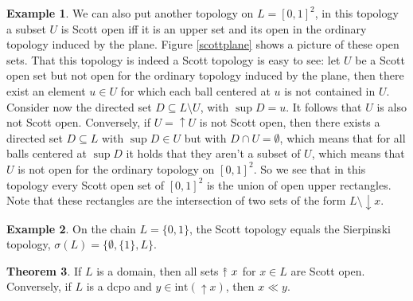 \documentclass[a4paper,12pt]{article}
\newcommand{\upuparrow}{\mathrel{\reflectbox{\rotatebox[origin=c]{90}{$\twoheadrightarrow$}}}}
\theoremstyle{definition}
\newtheorem{theorem}{Theorem}[section]
\newtheorem{example}[theorem]{Example}
\renewcommand{\int}{\text{int}}
\begin{document}
\begin{example}
We can also put another topology on $L = [0,1]^2$, in this topology a subset $U$ is Scott open iff it is an upper set and its open in the ordinary topology induced by the plane. Figure \ref{scottplane} shows a picture of these open sets. That this topology is indeed a Scott topology is easy to see: let $U$ be a Scott open set but not open for the ordinary topology induced by the plane, then there exist an element $u \in U$ for which each ball centered at $u$ is not contained in $U$. Consider now the directed set $D \subseteq L\setminus U$, with $\sup D = u$. It follows that $U$ is also not Scott open. Conversely, if $U = \uparrow U$ is not Scott open, then there exists a directed set $D \subseteq L$ with $\sup D \in U$ but with $D \cap U = \emptyset$, which means that for all balls centered at $\sup D$ it holds that they aren't a subset of $U$, which means that $U$ is not open for the ordinary topology on $[0,1]^2$. So we see that in this topology every Scott open set of $[0,1]^2$ is the union of open upper rectangles. Note that these rectangles are the intersection of two sets of the form $L\setminus \downarrow x$.
\end{example}
\begin{example}
On the chain $L = \{0, 1\}$, the Scott topology equals the Sierpinski topology, $\sigma(L) = \{\emptyset, \{1\}, L\}$.
\end{example}

\begin{theorem}\label{begindomein}
If $L$ is a domain, then all sets $\upuparrow x$ for $x \in L$ are Scott open. Conversely, if $L$ is a dcpo and $y \in \int(\uparrow x)$, then $x \ll y$.
\end{theorem}
\end{document}
